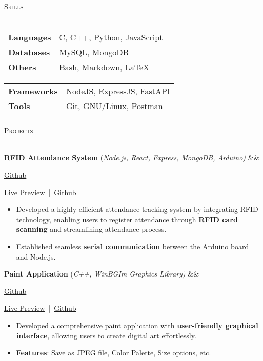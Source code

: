 \documentclass[a4paper]{article}
\newcommand{\bulletSep} { \vspace{1.5mm} }
\newcommand{\sectionSep} { \vspace{2.2mm} }
\newcommand{\lineunder} {
    \vspace*{-8pt} \\
    \hspace*{-15pt} \hrulefill \\
}
\newcommand{\header} [1] {
    {\hspace*{-18pt}\vspace*{6pt} {
        \fontfamily{qcs}\selectfont \large \scshape #1
    }}
    \vspace*{-6pt} \lineunder
    \vspace{0.5mm}
}
\newcommand{\experienceItem}[5]{
    \textbf{#1} \hfill #2 \\
    \textit{#3} \hfill #4 \\
    \begin{itemize}
        #5
    \end{itemize}
}
\newcommand{\linkFont}[1]{
    {\fontfamily{lmtt}\selectfont#1}
}
\newcommand{\link}[2]{
    {\fontfamily{lmtt}\selectfont\href{#1}{#2}}
}
\newcommand{\projectItem}[5]{
    {\textbf{#1}} {(\sl #2)}\hfill
    \ifx&#3&%
    \link{#4}{Github}\\
    \else
    \linkFont{\href{#3}{Live Preview}~|~\href{#4}{Github}}\\
    \fi
    \begin{itemize}
        #5
    \end{itemize}
}
\begin{document}


\header{Skills}
\begin{minipage}[t]{0.49\textwidth}
    \begin{tabular}{@{}ll}
        \textbf{Languages} & C, C++, Python, JavaScript \\
        \textbf{Databases} & MySQL, MongoDB             \\
        \textbf{Others}    & Bash, Markdown, \LaTeX
    \end{tabular}
\end{minipage}
\hfill
\begin{minipage}[t]{0.4\textwidth}
    \begin{tabular}{@{}ll}
        \textbf{Frameworks} & NodeJS, ExpressJS, FastAPI \\
        \textbf{Tools}      & Git, GNU/Linux, Postman    \\
        \textbf{}           &                            \\
    \end{tabular}
\end{minipage}
\sectionSep


\header{Projects}

\projectItem{RFID Attendance System}{Node.js, React, Express, MongoDB, Arduino}{}{https://github.com/AkshatAggarwal14/RFID-Attendance-system}{
    \item Developed a highly efficient attendance tracking system by integrating RFID technology, enabling users to register attendance through \textbf{RFID card scanning} and streamlining attendance process.
    \item Established seamless \textbf{serial communication} between the Arduino board and Node.js.
}
\bulletSep

\projectItem{Paint Application}{C++, WinBGIm Graphics Library}{}{https://github.com/Sahil-187/Paint-Application}{
    \item Developed a comprehensive paint application with \textbf{user-friendly graphical interface}, allowing users to create digital art effortlessly.
    \item \textbf{Features}: Save as JPEG file, Color Palette, Size options, etc.
}
\bulletSep
\end{document}
